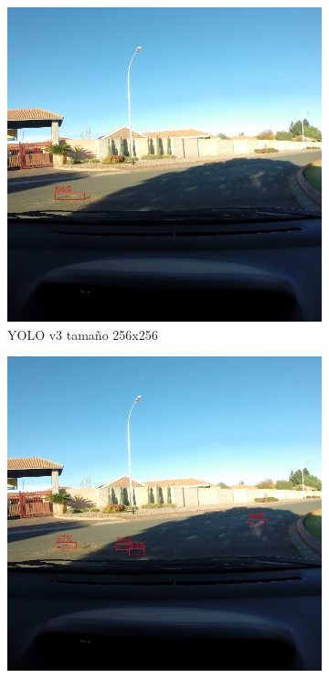 \begin{figure}[H]
\begin{subfigure}[h]{0.45\linewidth}
		\includegraphics[width=\linewidth]{images/results_a_yolo_v3_256.jpg}
		\caption{YOLO v3 tamaño 256x256}
	\end{subfigure}
	\begin{subfigure}[h]{0.45\linewidth}
		\includegraphics[width=\linewidth]{images/results_a_yolo_v3_416.jpg}

\end{subfigure}
\end{figure}
